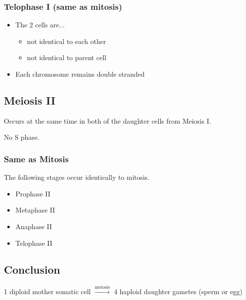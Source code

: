 \documentclass[a4paper,12pt]{article}
\begin{document}
\subsubsection{Telophase I (same as mitosis)}
\begin{itemize}
    \item{
            The 2 cells are...
            \begin{itemize}
                \item{not identical to each other}
                \item{not identical to parent cell}
            \end{itemize}
        }
    \item{Each chromosome remains double stranded}
\end{itemize}

\subsection{Meiosis II}\noindent

Occurs at the same time in both of the daughter cells from Meiosis I.

No S phase.

\subsubsection{Same as Mitosis}
The following stages occur identically to mitosis.

\begin{itemize}
    \item{Prophase II}
    \item{Metaphase II}
    \item{Anaphase II}
    \item{Telophase II}
\end{itemize}

\subsection{Conclusion}
1 diploid mother somatic cell $\xrightarrow{\textrm{meiosis}}$ 4 haploid daughter gametes (sperm or egg)
\end{document}
